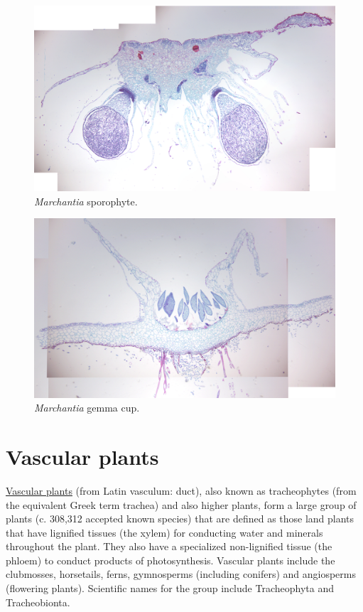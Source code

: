 \begin{figure}

{\centering \includegraphics[width=0.7\linewidth]{./figures/mosses/marchantia_sporophyte}

}

\caption{\emph{Marchantia} sporophyte.}\label{fig:marchantiasporophyte}
\end{figure}

\begin{figure}

{\centering \includegraphics[width=0.7\linewidth]{./figures/mosses/marchantia_gemma_cup}

}

\caption{\emph{Marchantia} gemma cup.}\label{fig:gemma}
\end{figure}

\section{Vascular plants}\label{vascular-plants}

\href{https://en.wikipedia.org/wiki/Vascular_plant}{Vascular plants}
(from Latin vasculum: duct), also known as tracheophytes (from the
equivalent Greek term trachea) and also higher plants, form a large
group of plants (c. 308,312 accepted known species) that are defined as
those land plants that have lignified tissues (the xylem) for conducting
water and minerals throughout the plant. They also have a specialized
non-lignified tissue (the phloem) to conduct products of photosynthesis.
Vascular plants include the clubmosses, horsetails, ferns, gymnosperms
(including conifers) and angiosperms (flowering plants). Scientific
names for the group include Tracheophyta and Tracheobionta.

